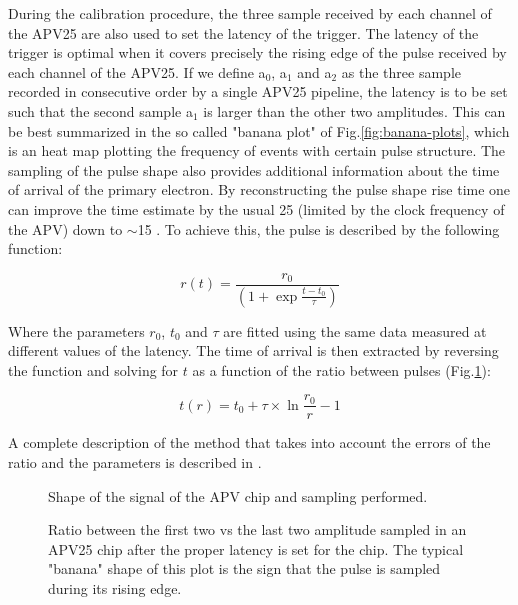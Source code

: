 During the calibration procedure, the three sample received by each channel of the APV25 are also used to set the latency of the trigger. The latency of the trigger is optimal when it covers precisely the rising edge of the pulse received by each channel of the APV25. If we define a$_0$, a$_1$ and a$_2$ as the three sample recorded in consecutive order by a single APV25 pipeline, the latency is to be set such that the second sample a$_1$ is larger than the other two amplitudes. This can be best summarized in the so called "banana plot" of Fig.\ref{fig:banana-plots}, which is an heat map plotting the frequency of events with certain pulse structure. The sampling of the pulse shape also provides additional information about the time of arrival of the primary electron. By reconstructing the pulse shape rise time one can improve the time estimate by the usual 25 \nas (limited by the clock frequency of the APV) down to $\sim$15 \nas \cite{Banerjee:2017mdu}. To achieve this, the pulse is described by the following function:

\begin{equation}
  \label{eq:apv-pulse}
  r(t) = \frac{r_0}{(1 + \exp{\frac{t-t_0}{\tau}})}
\end{equation}

Where the parameters $r_0$, $t_0$ and $\tau$ are fitted using the same data measured at different values of the latency. The time of arrival is then extracted by reversing the function and solving for $t$ as a function of the ratio between pulses (Fig.\ref{fig:apv-signal-shape}):

\begin{equation}
  \label{eq:2}
  t(r) = t_0 + \tau \times \ln{\frac{r_0}{r} - 1}
\end{equation}

A complete description of the method that takes into account the errors of the ratio and the parameters is described in \cite{dbanerjee-thesis}.


\begin{figure}[bth!]
  \centering
  
  \caption[apv signal shape]{Shape of the signal of the APV chip and sampling performed.}
  \label{fig:apv-signal-shape}
\end{figure}

\begin{figure}[!bth]
  \centering
  
  \caption[APV25 banana plot]{Ratio between the first two vs the last two amplitude sampled in an APV25 chip after the proper latency is set for the chip. The typical "banana" shape of this plot is the sign that the pulse is sampled during its rising edge.}
  \label{fig:banana-plot}
\end{figure}

